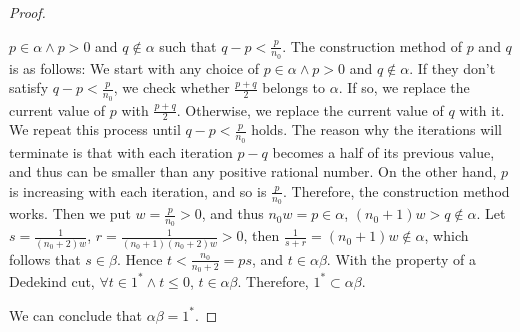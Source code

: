\documentclass[onecolumn]{article}
\begin{document}
\begin{proof}
\begin{itemize}
    $p \in \alpha \wedge p > 0$ and $q \notin \alpha$ such that 
    $q - p < \frac{p}{n_0}$. The construction method of $p$ and $q$ is as 
    follows: We start with any choice of $p \in \alpha \wedge p > 0$ and 
    $q \notin \alpha$. If they don't satisfy $q - p < \frac{p}{n_0}$, we check 
    whether $\frac{p+q}{2}$ belongs to $\alpha$. If so, we replace the current 
    value of $p$ with $\frac{p+q}{2}$. Otherwise, we replace the current value 
    of $q$ with it. We repeat this process until $q - p < \frac{p}{n_0}$ holds.
    The reason why the iterations will terminate is that with each iteration 
    $p - q$ becomes a half of its previous value, and thus can be smaller than 
    any positive rational number. On the other hand, $p$ is increasing with each 
    iteration, and so is $\frac{p}{n_0}$. Therefore, the construction method 
    works. Then we put $w = \frac{p}{n_0} > 0$, and thus $n_0 w = p \in \alpha$, 
    $(n_0 + 1)w > q \notin \alpha$. Let $s = \frac{1}{(n_0+2)w}$, 
    $r = \frac{1}{(n_0+1)(n_0+2)w} > 0$, then 
    $\frac{1}{s+r} = (n_0+1)w \notin \alpha$, which follows that $s \in \beta$. 
    Hence $t < \frac{n_0}{n_0+2} = ps$, and $t \in \alpha \beta$. With the 
    property of a Dedekind cut, $\forall t \in 1^* \wedge t \leq 0$, 
    $t \in \alpha \beta$. Therefore, $1^* \subset \alpha \beta$.
  \end{itemize}
  We can conclude that $\alpha \beta = 1^*$.
\end{proof}
\end{document}
